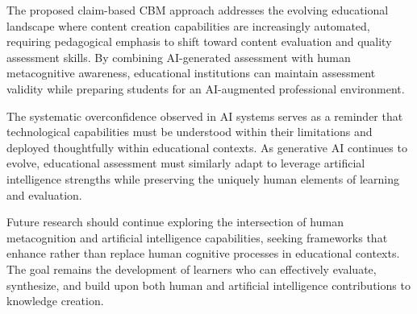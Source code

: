 \documentclass[sigconf]{acmart}
\begin{document}
The proposed claim-based CBM approach addresses the evolving educational landscape where content creation capabilities are increasingly automated, requiring pedagogical emphasis to shift toward content evaluation and quality assessment skills. By combining AI-generated assessment with human metacognitive awareness, educational institutions can maintain assessment validity while preparing students for an AI-augmented professional environment.

The systematic overconfidence observed in AI systems serves as a reminder that technological capabilities must be understood within their limitations and deployed thoughtfully within educational contexts. As generative AI continues to evolve, educational assessment must similarly adapt to leverage artificial intelligence strengths while preserving the uniquely human elements of learning and evaluation.

Future research should continue exploring the intersection of human metacognition and artificial intelligence capabilities, seeking frameworks that enhance rather than replace human cognitive processes in educational contexts. The goal remains the development of learners who can effectively evaluate, synthesize, and build upon both human and artificial intelligence contributions to knowledge creation.



\end{document}
